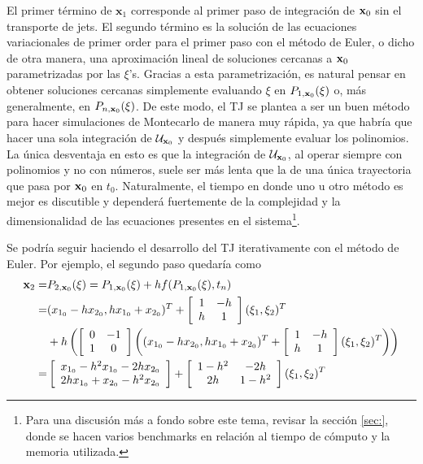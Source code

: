 El primer término de $\mathbf{x}_1$ corresponde al primer paso de integración de $\mathbf{x}_0$ sin el transporte de jets. El segundo término es la solución de las ecuaciones variacionales de primer order para el primer paso con el método de Euler, o dicho de otra manera, una aproximación lineal de soluciones cercanas a $\mathbf{x}_0$ parametrizadas por las $\xi$'s. Gracias a esta parametrización, es natural pensar en obtener soluciones cercanas simplemente evaluando $\xi$ en $P_{1,\mathbf{x}_0}(\xi)$ o, más generalmente, en $P_{n,\mathbf{x}_0}(\xi)$. De este modo, el TJ se plantea a ser un buen método para hacer simulaciones de Montecarlo de manera muy rápida, ya que habría que hacer una sola integración de $\mathcal{U}_{\mathbf{x}_0}$ y después simplemente evaluar los polinomios. La única desventaja en esto es que la integración de $\mathcal{U}_{\mathbf{x}_0}$, al operar siempre con polinomios y no con números, suele ser más lenta que la de una única trayectoria que pasa por $\mathbf{x}_0$ en $t_0$. Naturalmente, el tiempo en donde uno u otro método es mejor es discutible y dependerá fuertemente de la complejidad y la dimensionalidad de las ecuaciones presentes en el sistema\footnote{Para una discusión más a fondo sobre este tema, revisar la sección \ref{sec:}, donde se hacen varios benchmarks en relación al tiempo de cómputo y la memoria utilizada.}.

Se podría seguir haciendo el desarrollo del TJ iterativamente con el método de Euler. Por ejemplo, el segundo paso quedaría como 
\begin{align*}
\mathbf{x}_2 =& P_{2,\mathbf{x}_0}(\xi) = P_{1,\mathbf{x}_0}(\xi) + h f(P_{1,\mathbf{x}_0}(\xi),t_n) \\
=& (x_{1_0} - h x_{2_0}, h x_{1_0} + x_{2_0} )^T + \left[ \begin{array}{cc}
 1 & -h  \\
h & 1  \\
\end{array} \right] (\xi_1,\xi_2)^T \\ 
&+ h \left( \left[ \begin{array}{cc}
 0 & -1  \\
 1 &  0  \\
\end{array} \right] \left( (x_{1_0} - h x_{2_0}, h x_{1_0} + x_{2_0} )^T + \left[ \begin{array}{cc}
 1 & -h  \\
h & 1  \\
\end{array} \right] (\xi_1,\xi_2)^T \right) \right) \\
=& \left[ \begin{array}{c}
x_{1_0} - h^2x_{1_0} - 2h x_{2_0}  \\
2h x_{1_0} + x_{2_0}  - h^2x_{2_0}  \\
\end{array} \right] + \left[ \begin{array}{cc}
 1-h^2 & -2h  \\
2h & 1-h^2  \\
\end{array} \right] (\xi_1,\xi_2)^T
\end{align*}
 
